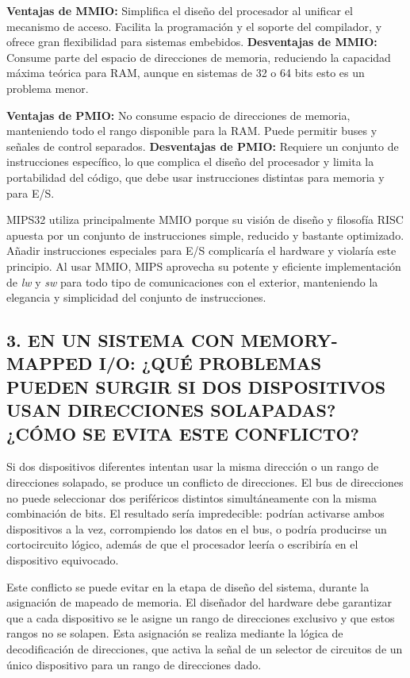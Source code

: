 \documentclass[12pt]{article}
\begin{document}
\textbf{Ventajas de MMIO:} Simplifica el diseño del procesador al unificar el mecanismo de acceso. Facilita la programación y el soporte del compilador, y ofrece gran flexibilidad para sistemas embebidos. 
\textbf{Desventajas de MMIO:} Consume parte del espacio de direcciones de memoria, reduciendo la capacidad máxima teórica para RAM, aunque en sistemas de 32 o 64 bits esto es un problema menor.

\textbf{Ventajas de PMIO:} No consume espacio de direcciones de memoria, manteniendo todo el rango disponible para la RAM. Puede permitir buses y señales de control separados.
\textbf{Desventajas de PMIO:} Requiere un conjunto de instrucciones específico, lo que complica el diseño del procesador y limita la portabilidad del código, que debe usar instrucciones distintas para memoria y para E/S.

MIPS32 utiliza principalmente MMIO porque su visión de diseño y filosofía RISC apuesta por un conjunto de instrucciones simple, reducido y bastante optimizado. Añadir instrucciones especiales para E/S complicaría el hardware y violaría este principio. Al usar MMIO, MIPS aprovecha su potente y eficiente implementación de \textit{lw} y \textit{sw} para todo tipo de comunicaciones con el exterior, manteniendo la elegancia y simplicidad del conjunto de instrucciones.

\subsection*{3. EN UN SISTEMA CON MEMORY-MAPPED I/O: ¿QUÉ PROBLEMAS PUEDEN SURGIR SI DOS DISPOSITIVOS USAN DIRECCIONES SOLAPADAS? ¿CÓMO SE EVITA ESTE CONFLICTO?}

Si dos dispositivos diferentes intentan usar la misma dirección o un rango de direcciones solapado, se produce un conflicto de direcciones. El bus de direcciones no puede seleccionar dos periféricos distintos simultáneamente con la misma combinación de bits. El resultado sería impredecible: podrían activarse ambos dispositivos a la vez, corrompiendo los datos en el bus, o podría producirse un cortocircuito lógico, además de que el procesador leería o escribiría en el dispositivo equivocado.

Este conflicto se puede evitar en la etapa de diseño del sistema, durante la asignación de mapeado de memoria. El diseñador del hardware debe garantizar que a cada dispositivo se le asigne un rango de direcciones exclusivo y que estos rangos no se solapen. Esta asignación se realiza mediante la lógica de decodificación de direcciones, que activa la señal de un selector de circuitos de un único dispositivo para un rango de direcciones dado.
\end{document}
